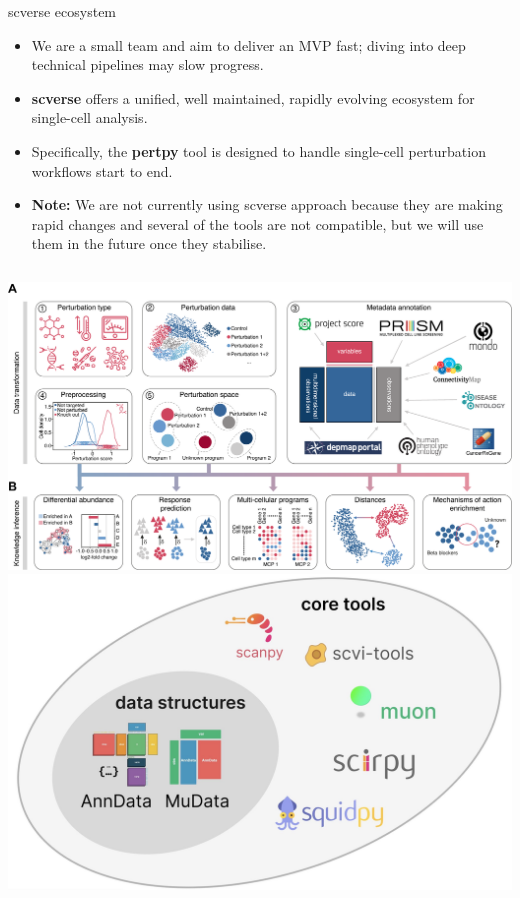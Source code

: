 \documentclass[handout]{beamer}
\begin{document}
\begin{frame}{scverse ecosystem}
    \begin{itemize}
        \item We are a small team and aim to deliver an MVP fast; diving into deep technical pipelines may slow progress.
        \item \textbf{scverse} offers a unified, well maintained, rapidly evolving ecosystem for single-cell analysis.
        \item Specifically, the \textbf{pertpy} tool is designed to handle single-cell perturbation workflows start to end.
        \item \textbf{Note:} We are not currently using scverse approach because they are making rapid changes and several of the tools are not compatible, but we will use them in the future once they stabilise.
    \end{itemize}
    \vspace{1em}
    \begin{columns}
        \centering
        \includegraphics[width=0.8\linewidth]{pertpy.png}
        \centering
        \includegraphics[width=0.8\linewidth]{scverse.jpg}
    \end{columns}
\end{frame}
\end{document}
